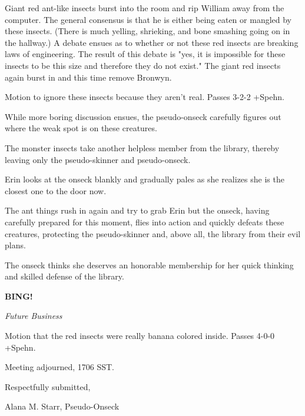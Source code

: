 \documentclass[12pt]{article}
\newcommand{\bing}{{\bf BING!} }
\newcommand{\goto}[1]{\bing \vskip 12pt \centerline{{\em{#1}}}}
\begin{document}
Giant red ant-like insects burst into the room and rip William away from the computer. The general consensus is that he is either being eaten or mangled by these insects. (There is much yelling, shrieking, and bone smashing going on in the hallway.) A debate ensues as to whether or not these red insects are breaking laws of engineering. The result of this debate is "yes, it is impossible for these insects to be this size and therefore they do not exist." The giant red insects again burst in and this time remove Bronwyn.

Motion to ignore these insects because they aren't real. Passes 3-2-2 +Spehn.

While more boring discussion ensues, the pseudo-onseck carefully figures out where the weak spot is on these creatures.

The monster insects take another helpless member from the library, thereby leaving only the pseudo-skinner and pseudo-onseck.

Erin looks at the onseck blankly and gradually pales as she realizes she is the closest one to the door now.

The ant things rush in again and try to grab Erin but the onseck, having carefully prepared for this moment, flies into action and quickly defeats these creatures, protecting the pseudo-skinner and, above all, the library from their evil plans.

The onseck thinks she deserves an honorable membership for her quick thinking and skilled defense of the library.

\goto{Future Business}

Motion that the red insects were really banana colored inside. Passes 4-0-0 +Spehn.

\vspace{12pt}

\noindent
Meeting adjourned, 1706 SST.

\vspace{18pt}

\centerline{Respectfully submitted,}
\centerline{Alana M. Starr, Pseudo-Onseck}
\end{document}
